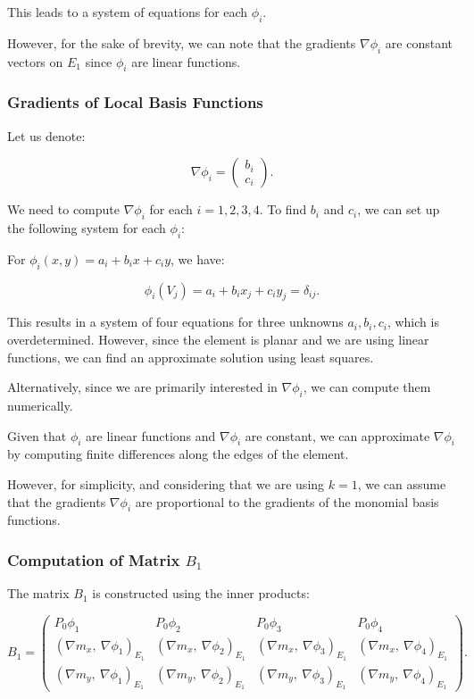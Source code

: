 \documentclass[class=article, crop=false]{standalone}
\begin{document}
This leads to a system of equations for each \( \phi_i \).

However, for the sake of brevity, we can note that the gradients \( \nabla \phi_i \) are constant vectors on \( E_1 \) since \( \phi_i \) are linear functions.

\subsubsection{Gradients of Local Basis Functions}

Let us denote:

\[
\nabla \phi_i = \begin{pmatrix} b_i \\ c_i \end{pmatrix}.
\]

We need to compute \( \nabla \phi_i \) for each \( i = 1, 2, 3, 4 \). To find \( b_i \) and \( c_i \), we can set up the following system for each \( \phi_i \):

For \( \phi_i(x, y) = a_i + b_i x + c_i y \), we have:

\[
\phi_i(V_j) = a_i + b_i x_j + c_i y_j = \delta_{ij}.
\]

This results in a system of four equations for three unknowns \( a_i, b_i, c_i \), which is overdetermined. However, since the element is planar and we are using linear functions, we can find an approximate solution using least squares.

Alternatively, since we are primarily interested in \( \nabla \phi_i \), we can compute them numerically.

Given that \( \phi_i \) are linear functions and \( \nabla \phi_i \) are constant, we can approximate \( \nabla \phi_i \) by computing finite differences along the edges of the element.

However, for simplicity, and considering that we are using \( k = 1 \), we can assume that the gradients \( \nabla \phi_i \) are proportional to the gradients of the monomial basis functions.

\subsubsection{Computation of Matrix \( B_1 \)}

The matrix \( B_1 \) is constructed using the inner products:

\[
B_1 = \begin{pmatrix}
P_0 \phi_1 & P_0 \phi_2 & P_0 \phi_3 & P_0 \phi_4 \\
\left( \nabla m_x,\ \nabla \phi_1 \right)_{E_1} & \left( \nabla m_x,\ \nabla \phi_2 \right)_{E_1} & \left( \nabla m_x,\ \nabla \phi_3 \right)_{E_1} & \left( \nabla m_x,\ \nabla \phi_4 \right)_{E_1} \\
\left( \nabla m_y,\ \nabla \phi_1 \right)_{E_1} & \left( \nabla m_y,\ \nabla \phi_2 \right)_{E_1} & \left( \nabla m_y,\ \nabla \phi_3 \right)_{E_1} & \left( \nabla m_y,\ \nabla \phi_4 \right)_{E_1}
\end{pmatrix}.
\]
\end{document}

